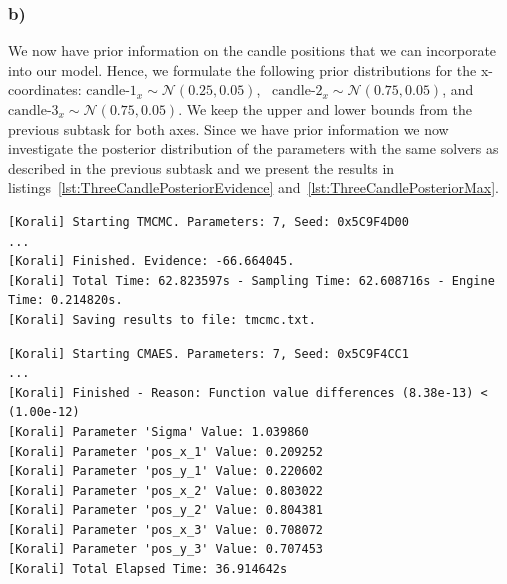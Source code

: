 \documentclass{article}
\begin{document}
    \subsubsection*{b)}
    \label{subsubsec:Task2b}

    We now have prior information on the candle positions that we can
    incorporate into our model.
    Hence, we formulate the following prior distributions for the
    x-coordinates:
    \mbox{$\text{candle-}1_{ x} \sim \mathcal{N}\left( 0.25, 0.05 \right)$}, \
    \mbox{$\text{candle-}2_{ x} \sim \mathcal{N}\left( 0.75, 0.05 \right)$}, and
    \mbox{$\text{candle-}3_{ x} \sim \mathcal{N}\left( 0.75, 0.05 \right)$}.
    We keep the upper and lower bounds from the previous subtask for both
    axes.
    Since we have prior information we now investigate the posterior
    distribution of the parameters with the same solvers as described in the
    previous subtask and we present the results in
    listings~\ref{lst:ThreeCandlePosteriorEvidence}
    and~\ref{lst:ThreeCandlePosteriorMax}.

   \begin{lstlisting}[basicstyle=\tiny, frame=single, caption={Korali
    output when sampling the posterior distribution of the candle positions
   for the 3-candle model.}, label={lst:ThreeCandlePosteriorEvidence}]
[Korali] Starting TMCMC. Parameters: 7, Seed: 0x5C9F4D00
...
[Korali] Finished. Evidence: -66.664045.
[Korali] Total Time: 62.823597s - Sampling Time: 62.608716s - Engine Time: 0.214820s.
[Korali] Saving results to file: tmcmc.txt.
   \end{lstlisting}
   \begin{lstlisting}[basicstyle=\tiny, frame=single, caption={Korali
    output when maximizing the posterior distribution of the candle positions
   for the 3-candle model.}, label={lst:ThreeCandlePosteriorMax}]
[Korali] Starting CMAES. Parameters: 7, Seed: 0x5C9F4CC1
...
[Korali] Finished - Reason: Function value differences (8.38e-13) < (1.00e-12)
[Korali] Parameter 'Sigma' Value: 1.039860
[Korali] Parameter 'pos_x_1' Value: 0.209252
[Korali] Parameter 'pos_y_1' Value: 0.220602
[Korali] Parameter 'pos_x_2' Value: 0.803022
[Korali] Parameter 'pos_y_2' Value: 0.804381
[Korali] Parameter 'pos_x_3' Value: 0.708072
[Korali] Parameter 'pos_y_3' Value: 0.707453
[Korali] Total Elapsed Time: 36.914642s
    \end{lstlisting}
\end{document}
